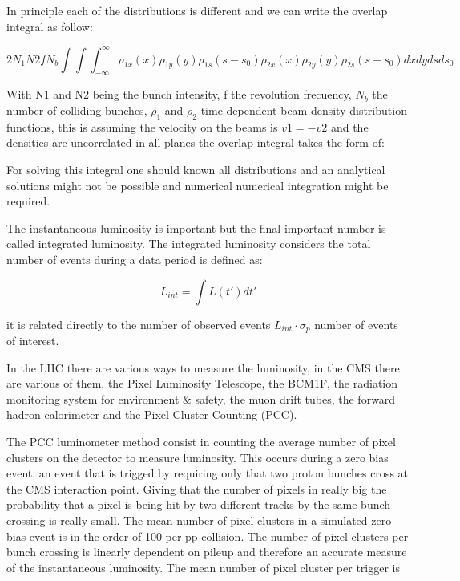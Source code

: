 In principle each of the distributions is different and we can write the overlap integral as follow:

\begin{equation}
 2N_{1}N{2}fN_{b} \int \int \int^{\infty}_{-\infty}  \rho_{1x} (x) \rho_{1y}(y) \rho_{1s} (s-s_{0}) \rho_{2x}(x) \rho_{2y}(y) \rho_{2s} (s+s_{0}) dxdydsds_{0}  
\end{equation}

With N1 and N2 being the bunch intensity, f the revolution frecuency, $N_{b}$ the number of colliding bunches, $\rho_{1}$ and $\rho_{2}$ time dependent beam density distribution functions, this is assuming the velocity on the beams is $v1 = -v2$ and the densities are uncorrelated in all planes the overlap integral takes the form of: \cite{Lumvdm}

For solving this integral one should known all distributions and an analytical solutions might not be possible and numerical numerical integration might be required.


The instantaneous luminosity is important  but the final important number is called integrated luminosity. The integrated luminosity considers the total number of events during a data period is defined as: 

\begin{equation}
 L_{int} = \int L (t') dt' 
\end{equation}

it is related directly to the number of observed events $L_{int} \cdot \sigma_{p}$ number of events of interest.


In the LHC there are various ways to measure the luminosity, in the CMS there are various of them, the Pixel Luminosity Telescope, the BCM1F, the radiation monitoring system for environment & safety, the muon drift tubes, the forward hadron calorimeter and the Pixel Cluster Counting (PCC). 

The PCC luminometer method consist in counting the average number of pixel clusters on the detector to measure luminosity. This occurs during a zero bias event, an event that is trigged by requiring only that two proton bunches cross at the CMS interaction point. Giving that the number of pixels in really big the probability that a pixel is being hit by two different tracks by the same bunch crossing is really small. The mean number of pixel clusters in a simulated zero bias event is in the order of 100 per pp collision. The number of pixel clusters per bunch crossing is linearly dependent on pileup and therefore an accurate measure of the instantaneous luminosity.\cite{PCC1} The mean number of pixel cluster per trigger is 


